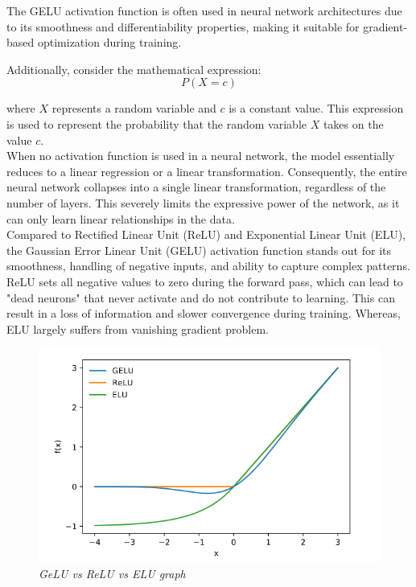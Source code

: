 The GELU activation function is often used in neural network architectures due to its smoothness and differentiability properties, making it suitable for gradient-based optimization during training.

Additionally, consider the mathematical expression:
\begin{equation}
    P(X = c) \label{eq:probability}
\end{equation}

where $X$ represents a random variable and $c$ is a constant value. This expression is used to represent the probability that the random variable $X$ takes on the value $c$.\\

When no activation function is used in a neural network, the model essentially reduces to a linear regression or a linear transformation. Consequently, the entire neural network collapses into a single linear transformation, regardless of the number of layers. This severely limits the expressive power of the network, as it can only learn linear relationships in the data.\\

Compared to Rectified Linear Unit (ReLU) and Exponential Linear Unit (ELU), the Gaussian Error Linear Unit (GELU) activation function stands out for its smoothness, handling of negative inputs, and ability to capture complex patterns. ReLU sets all negative values to zero during the forward pass, which can lead to "dead neurons" that never activate and do not contribute to learning. This can result in a loss of information and slower convergence during training. Whereas, ELU largely suffers from vanishing gradient problem.

\begin{figure}[htbp]
    \centering
    \includegraphics[width=6in]{img/gelu vs relu.png}
    \caption{\textit{GeLU vs ReLU vs ELU graph}}
\end{figure}

